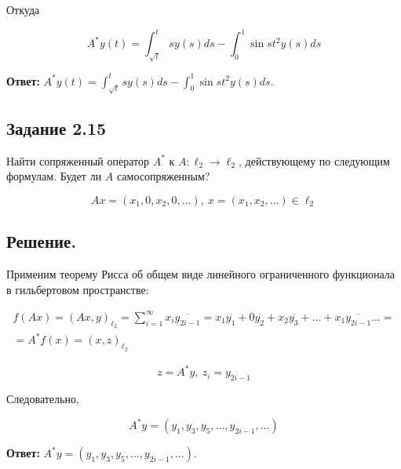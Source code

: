 \documentclass[a4paper, 12pt]{report}
\begin{document}
Откуда

\[A^* y(t) = \int_{\sqrt{t}}^{t} s y(s) ds - \int_{0}^{1} \sin s t^2 y(s) ds\]

\textbf{Ответ:} $A^* y(t) = \int_{\sqrt{t}}^{t} s y(s) ds - \int_{0}^{1} \sin s t^2 y(s) ds$.

\newpage

\subsection*{Задание 2.15}

Найти сопряженный оператор $A^*$ к $A: \ell_2 \to \ell_2$, действующему по 
следующим формулам. Будет ли $A$ самосопряженным?

\[Ax = (x_1, 0, x_2, 0, \dots ),\ x = (x_1, x_2, \dots ) \in \ell_2\]

\subsection*{Решение.}

Применим теорему Рисса об общем виде линейного ограниченного функционала в 
гильбертовом пространстве:

\begin{multline*}
f(Ax) = (Ax, y)_{\ell_2} = \sum_{i = 1}^{\infty} x_i \overline{y_{2i - 1}} = x_1 \overline{y_1} +
0 \overline{y_2} + x_2 \overline{y_3} + \dots + x_1 \overline{y_{2i - 1}} \dots  = \\ =
A^* f(x) = (x, z)_{\ell_2}
\end{multline*}

\[z = A^* y,\ z_i = y_{2i - 1}\]

Следовательно,

\[A^* y = (y_1, y_3, y_5, \dots , y_{2i - 1}, \dots )\]

\textbf{Ответ: } $A^* y = (y_1, y_3, y_5, \dots , y_{2i - 1}, \dots )$.
\end{document}
